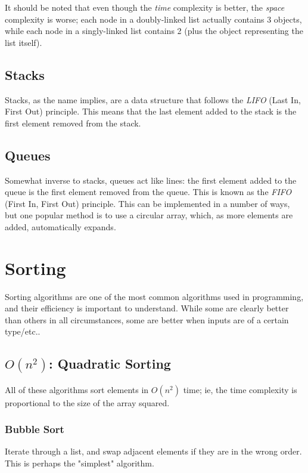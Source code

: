 \documentclass[12pt]{article}
\begin{document}
It should be noted that even though the \textit{time} complexity is better, the \textit{space} complexity is worse; each node in a doubly-linked list actually contains 3 objects, while each node in a singly-linked list contains 2 (plus the object representing the list itself).

\subsection{Stacks}

Stacks, as the name implies, are a data structure that follows the \textit{LIFO} (Last In, First Out) principle. This means that the last element added to the stack is the first element removed from the stack.

\subsection{Queues}

Somewhat inverse to stacks, queues act like lines: the first element added to the queue is the first element removed from the queue. This is known as the \textit{FIFO} (First In, First Out) principle. This can be implemented in a number of ways, but one popular method is to use a circular array, which, as more elements are added, automatically expands.

\section{Sorting}
Sorting algorithms are one of the most common algorithms used in programming, and their efficiency is important to understand. While some are clearly better than others in all circumstances, some are better when inputs are of a certain type/etc..

\subsection{$O(n^2)$: Quadratic Sorting}
All of these algorithms sort elements in $O(n^2)$ time; ie, the time complexity is proportional to the size of the array squared.

\subsubsection{Bubble Sort}
Iterate through a list, and swap adjacent elements if they are in the wrong order. This is perhaps the "simplest" algorithm.
\end{document}
